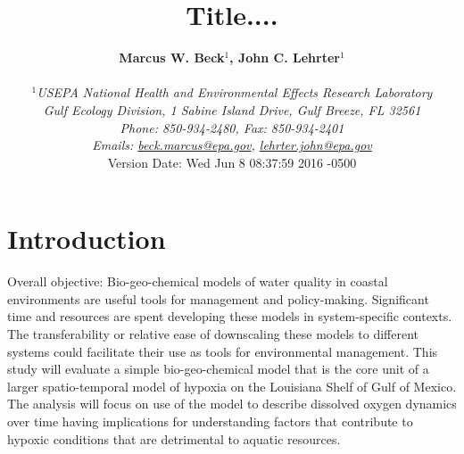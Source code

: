\documentclass[letterpaper,12pt,oneside]{article}\usepackage[]{graphicx}\usepackage[]{color}
\begin{document}
\raggedbottom
\linenumbers
\raggedright
{}
\setlength{\parindent}{0.5in}
\renewcommand\refname{References \vspace{12pt}}

\begin{singlespace}
\title{{\bf {\Large Title....}}}
\author{
  {\bf {\normalsize Marcus W. Beck$^1$, John C. Lehrter$^1$}}
  \\\\{\textit {\normalsize $^1$USEPA National Health and Environmental Effects Research Laboratory}}
  \\{\textit {\normalsize Gulf Ecology Division, 1 Sabine Island Drive, Gulf Breeze, FL 32561}}
	\\{\textit {\normalsize Phone: 850-934-2480, Fax: 850-934-2401}}
	\\{\textit {\normalsize Emails: \href{mailto:beck.marcus@epa.gov}{beck.marcus@epa.gov}, \href{mailto:lehrter.john@epa.gov}{lehrter.john@epa.gov}}}
  \vspace{1in} 
  \\ Version Date:   Wed Jun 8 08:37:59 2016 -0500
	}
\date{}
\maketitle
\end{singlespace}
\clearpage

\begin{abstract}
\noindent 
\end{abstract}
\acresetall

\section{Introduction}

Overall objective: Bio-geo-chemical models of water quality in coastal environments are useful tools for management and policy-making. Significant time and resources are spent developing these models in system-specific contexts. The transferability or relative ease of downscaling these models to different systems could facilitate their use as tools for environmental management. This study will evaluate a simple bio-geo-chemical model that is the core unit of a larger spatio-temporal model of hypoxia on the Louisiana Shelf of Gulf of Mexico. The analysis will focus on use of the model to describe dissolved oxygen dynamics over time having implications for understanding factors that contribute to hypoxic conditions that are detrimental to aquatic resources.
\end{document}
